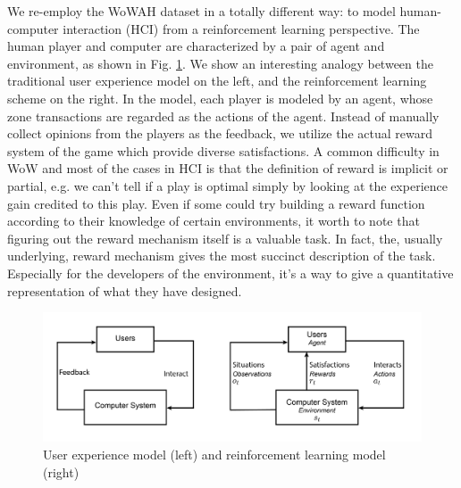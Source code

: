 \documentclass{sigchi}
\begin{document}
We re-employ the WoWAH dataset in a totally different way: to model human-computer interaction (HCI) from a reinforcement learning perspective.
The human player and computer are characterized by a pair of agent and environment, as shown in Fig. \ref{fig:chi}.
We show an interesting analogy between the traditional user experience model on the left, and the reinforcement learning scheme on the right.
In the model, each player is modeled by an agent, whose zone transactions are regarded as the actions of the agent.
Instead of manually collect opinions from the players as the feedback, we utilize the actual reward system of the game which provide diverse satisfactions.
A common difficulty in WoW and most of the cases in HCI is that the definition of reward is implicit or partial, e.g. we can't tell if a play is optimal simply by looking at the experience gain credited to this play.
Even if some could try building a reward function according to their knowledge of certain environments, it worth to note that figuring out the reward mechanism itself is a valuable task.
In fact, the, usually underlying, reward mechanism gives the most succinct description of the task.
Especially for the developers of the environment, it's a way to give a quantitative representation of what they have designed.

\begin{figure}[t]
    \centering
    \includegraphics[width=\textwidth]{figs/rl-vs-chi.jpg}
    \caption{User experience model (left) and reinforcement learning model (right)}
    \label{fig:chi}
\end{figure}
\end{document}
